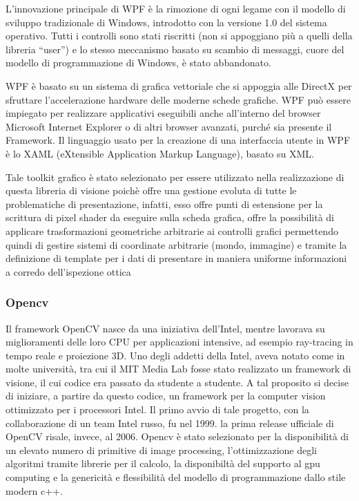 L'innovazione principale di WPF è la rimozione di ogni legame con il modello di sviluppo tradizionale di Windows, introdotto con la versione 1.0 del sistema operativo. Tutti i controlli sono stati riscritti (non si appoggiano più a quelli della libreria “user”) e lo stesso meccanismo basato su scambio di messaggi, cuore del modello di programmazione di Windows, è stato abbandonato.

WPF è basato su un sistema di grafica vettoriale che si appoggia alle DirectX per sfruttare l'accelerazione hardware delle moderne schede grafiche. WPF può essere impiegato per realizzare applicativi eseguibili anche all'interno del browser Microsoft Internet Explorer o di altri browser avanzati, purché sia presente il Framework. Il linguaggio usato per la creazione di una interfaccia utente in WPF è lo XAML (eXtensible Application Markup Language), basato su XML.

Tale toolkit grafico è stato selezionato per essere utilizzato nella realizzazione di questa libreria di visione poichè offre una gestione evoluta di tutte le problematiche di presentazione, infatti, esso offre punti di estensione per la scrittura di pixel shader da eseguire sulla scheda grafica, offre la possibilità di applicare trasformazioni geometriche arbitrarie ai controlli grafici permettendo quindi di gestire sistemi di coordinate arbitrarie (mondo, immagine) e tramite la definizione di template per i dati di presentare in maniera uniforme informazioni a corredo dell'ispezione ottica

\subsubsection{Opencv}
Il framework OpenCV nasce da una iniziativa dell’Intel, mentre lavorava
su miglioramenti delle loro CPU per applicazioni intensive, ad esempio
ray-tracing in tempo reale e proiezione 3D. Uno degli addetti della Intel,
aveva notato come in molte universit\`{a}, tra cui il MIT Media Lab fosse stato realizzato un framework di visione, il cui codice era passato
da studente a studente. A tal proposito si decise di iniziare, a partire da
questo codice, un framework per la computer vision ottimizzato per i processori Intel. Il
primo avvio di tale progetto, con la collaborazione di un team Intel russo,
fu nel 1999. la prima release ufficiale di OpenCV risale, invece, al 2006.
Opencv è stato selezionato per la disponibilità di un elevato numero di primitive di image processing, l'ottimizzazione degli algoritmi tramite librerie per il calcolo, la disponibiltà del supporto al gpu computing e la genericità e flessibilità del modello di programmazione dallo stile modern c++.

